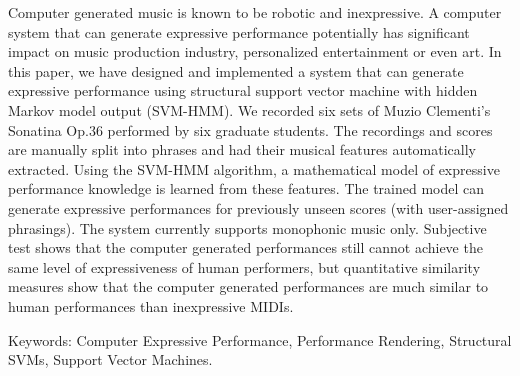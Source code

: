\begin{abstractEN}

Computer generated music is known to be robotic and inexpressive. A computer system that can generate expressive performance potentially has significant impact on music production industry, personalized entertainment or even art. In this paper, we have designed and implemented a system that can generate expressive performance using structural support vector machine with hidden Markov model output (SVM-HMM). We recorded six sets of Muzio Clementi's Sonatina Op.36 performed by six graduate students. The recordings and scores are manually split into phrases and had their musical features automatically extracted. Using the SVM-HMM algorithm, a mathematical model of expressive performance knowledge is learned from these features. The trained model can generate expressive performances for previously unseen scores (with user-assigned phrasings). The system currently supports monophonic music only. Subjective test shows that the computer generated performances still cannot achieve the same level of expressiveness of human performers, but quantitative similarity measures show that the computer generated performances are much similar to human performances than inexpressive MIDIs.

Keywords: Computer Expressive Performance, Performance Rendering, Structural SVMs, Support Vector Machines.
\end{abstractEN}
